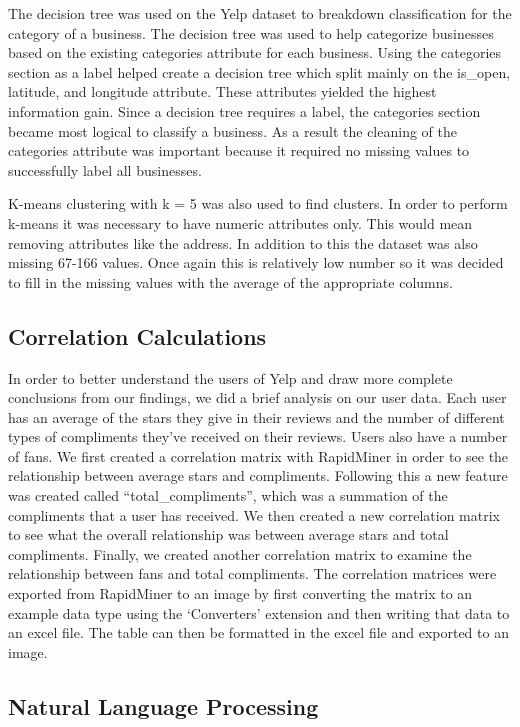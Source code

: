 \quad The decision tree was used on the Yelp dataset to breakdown classification for the category of a business. The decision tree was used to help categorize businesses based on the existing categories attribute for each business. Using the categories section as a label helped create a decision tree which split mainly on the is_open, latitude, and longitude attribute. These attributes yielded the highest information gain. Since a decision tree requires a label, the categories section became most logical to classify a business. As a result the cleaning of the categories attribute was important because it required no missing values to successfully label all businesses.

\quad K-means clustering with k = 5 was also used to find clusters. In order to perform k-means it was necessary to have numeric attributes only. This would mean removing attributes like the address. In addition to this the dataset was also missing 67-166 values. Once again this is relatively low number so it was decided to fill in the missing values with the average of the appropriate columns.

\subsection{Correlation Calculations}

\quad In order to better understand the users of Yelp and draw more complete conclusions from our findings, we did a brief analysis on our user data. Each user has an average of the stars they give in their reviews and the number of different types of compliments they’ve received on their reviews. Users also have a number of fans. We first created a correlation matrix with RapidMiner in order to see the relationship between average stars and compliments. Following this a new feature was created called “total_compliments”, which was a summation of the compliments that a user has received. We then created a new correlation matrix to see what the overall relationship was between average stars and total compliments. Finally, we created another correlation matrix to examine the relationship between fans and total compliments. The correlation matrices were exported from RapidMiner to an image by first converting the matrix to an example data type using the ‘Converters’ extension and then writing that data to an excel file. The table can then be formatted in the excel file and exported to an image.

\subsection{Natural Language Processing}

